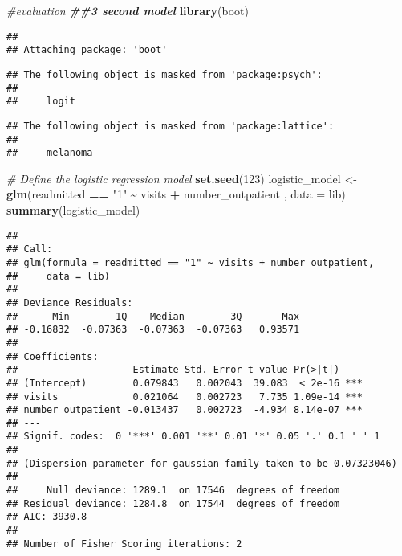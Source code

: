 \documentclass[
]{article}
\newenvironment{Shaded}{\begin{snugshade}}{\end{snugshade}}
\newcommand{\AttributeTok}[1]{\textcolor[rgb]{0.13,0.29,0.53}{#1}}
\newcommand{\CommentTok}[1]{\textcolor[rgb]{0.56,0.35,0.01}{\textit{#1}}}
\newcommand{\DecValTok}[1]{\textcolor[rgb]{0.00,0.00,0.81}{#1}}
\newcommand{\DocumentationTok}[1]{\textcolor[rgb]{0.56,0.35,0.01}{\textbf{\textit{#1}}}}
\newcommand{\FunctionTok}[1]{\textcolor[rgb]{0.13,0.29,0.53}{\textbf{#1}}}
\newcommand{\NormalTok}[1]{#1}
\newcommand{\OtherTok}[1]{\textcolor[rgb]{0.56,0.35,0.01}{#1}}
\newcommand{\SpecialCharTok}[1]{\textcolor[rgb]{0.81,0.36,0.00}{\textbf{#1}}}
\newcommand{\StringTok}[1]{\textcolor[rgb]{0.31,0.60,0.02}{#1}}
\begin{document}
\begin{Shaded}
\begin{Highlighting}[]
\CommentTok{\#evaluation }
\DocumentationTok{\#\#3 second model }
\FunctionTok{library}\NormalTok{(boot)}
\end{Highlighting}
\end{Shaded}

\begin{verbatim}
## 
## Attaching package: 'boot'
\end{verbatim}

\begin{verbatim}
## The following object is masked from 'package:psych':
## 
##     logit
\end{verbatim}

\begin{verbatim}
## The following object is masked from 'package:lattice':
## 
##     melanoma
\end{verbatim}

\begin{Shaded}
\begin{Highlighting}[]
\CommentTok{\# Define the logistic regression model}
\FunctionTok{set.seed}\NormalTok{(}\DecValTok{123}\NormalTok{)}
\NormalTok{logistic\_model }\OtherTok{\textless{}{-}} \FunctionTok{glm}\NormalTok{(readmitted }\SpecialCharTok{==} \StringTok{"1"} \SpecialCharTok{\textasciitilde{}}\NormalTok{ visits }\SpecialCharTok{+}\NormalTok{ number\_outpatient  , }\AttributeTok{data =}\NormalTok{ lib)}
\FunctionTok{summary}\NormalTok{(logistic\_model)}
\end{Highlighting}
\end{Shaded}

\begin{verbatim}
## 
## Call:
## glm(formula = readmitted == "1" ~ visits + number_outpatient, 
##     data = lib)
## 
## Deviance Residuals: 
##      Min        1Q    Median        3Q       Max  
## -0.16832  -0.07363  -0.07363  -0.07363   0.93571  
## 
## Coefficients:
##                    Estimate Std. Error t value Pr(>|t|)    
## (Intercept)        0.079843   0.002043  39.083  < 2e-16 ***
## visits             0.021064   0.002723   7.735 1.09e-14 ***
## number_outpatient -0.013437   0.002723  -4.934 8.14e-07 ***
## ---
## Signif. codes:  0 '***' 0.001 '**' 0.01 '*' 0.05 '.' 0.1 ' ' 1
## 
## (Dispersion parameter for gaussian family taken to be 0.07323046)
## 
##     Null deviance: 1289.1  on 17546  degrees of freedom
## Residual deviance: 1284.8  on 17544  degrees of freedom
## AIC: 3930.8
## 
## Number of Fisher Scoring iterations: 2
\end{verbatim}
\end{document}
